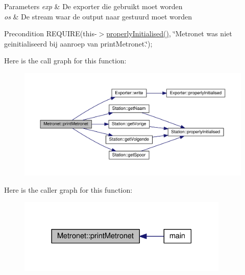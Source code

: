 \begin{DoxyParams}{Parameters}
{\em exp} & De exporter die gebruikt moet worden \\
\hline
{\em os} & De stream waar de output naar gestuurd moet worden \\
\hline
\end{DoxyParams}
\begin{DoxyPrecond}{Precondition}
R\+E\+Q\+U\+I\+RE(this-\/$>$\hyperlink{class_metronet_a3d2adce29a947f162924279b766de645}{properly\+Initialised()}, \char`\"{}\+Metronet was niet geinitialiseerd bij aanroep van print\+Metronet.\char`\"{}); 
\end{DoxyPrecond}


Here is the call graph for this function\+:
\nopagebreak
\begin{figure}[H]
\begin{center}
\leavevmode
\includegraphics[width=350pt]{class_metronet_a3d8b85c241fff3a9353c06320226e84e_cgraph}
\end{center}
\end{figure}




Here is the caller graph for this function\+:
\nopagebreak
\begin{figure}[H]
\begin{center}
\leavevmode
\includegraphics[width=285pt]{class_metronet_a3d8b85c241fff3a9353c06320226e84e_icgraph}
\end{center}
\end{figure}


